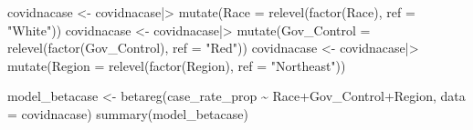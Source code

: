 \documentclass[
  letterpaper,
  DIV=11,
  numbers=noendperiod]{scrartcl}
\newenvironment{Shaded}{\begin{snugshade}}{\end{snugshade}}
\newcommand{\AttributeTok}[1]{\textcolor[rgb]{0.40,0.45,0.13}{#1}}
\newcommand{\FunctionTok}[1]{\textcolor[rgb]{0.28,0.35,0.67}{#1}}
\newcommand{\NormalTok}[1]{\textcolor[rgb]{0.00,0.23,0.31}{#1}}
\newcommand{\OtherTok}[1]{\textcolor[rgb]{0.00,0.23,0.31}{#1}}
\newcommand{\SpecialCharTok}[1]{\textcolor[rgb]{0.37,0.37,0.37}{#1}}
\newcommand{\StringTok}[1]{\textcolor[rgb]{0.13,0.47,0.30}{#1}}
\begin{document}
\begin{Shaded}
\begin{Highlighting}[]
\NormalTok{covidnacase }\OtherTok{\textless{}{-}}\NormalTok{ covidnacase}\SpecialCharTok{|\textgreater{}}
  \FunctionTok{mutate}\NormalTok{(}\AttributeTok{Race =} \FunctionTok{relevel}\NormalTok{(}\FunctionTok{factor}\NormalTok{(Race), }\AttributeTok{ref =} \StringTok{"White"}\NormalTok{))}
\NormalTok{covidnacase }\OtherTok{\textless{}{-}}\NormalTok{ covidnacase}\SpecialCharTok{|\textgreater{}}
  \FunctionTok{mutate}\NormalTok{(}\AttributeTok{Gov\_Control =} \FunctionTok{relevel}\NormalTok{(}\FunctionTok{factor}\NormalTok{(Gov\_Control), }\AttributeTok{ref =} \StringTok{"Red"}\NormalTok{))}
\NormalTok{covidnacase }\OtherTok{\textless{}{-}}\NormalTok{ covidnacase}\SpecialCharTok{|\textgreater{}}
  \FunctionTok{mutate}\NormalTok{(}\AttributeTok{Region =} \FunctionTok{relevel}\NormalTok{(}\FunctionTok{factor}\NormalTok{(Region), }\AttributeTok{ref =} \StringTok{"Northeast"}\NormalTok{))}
\end{Highlighting}
\end{Shaded}

\begin{Shaded}
\begin{Highlighting}[]
\NormalTok{model\_betacase }\OtherTok{\textless{}{-}} \FunctionTok{betareg}\NormalTok{(case\_rate\_prop }\SpecialCharTok{\textasciitilde{}}\NormalTok{ Race}\SpecialCharTok{+}\NormalTok{Gov\_Control}\SpecialCharTok{+}\NormalTok{Region, }\AttributeTok{data =}\NormalTok{ covidnacase)}
\FunctionTok{summary}\NormalTok{(model\_betacase)}
\end{Highlighting}
\end{Shaded}
\end{document}
